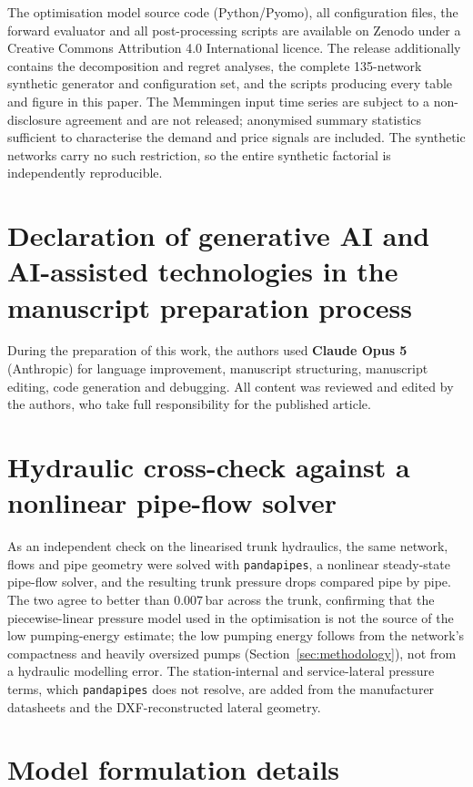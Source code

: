 \documentclass[a4paper,fleqn]{cas-sc}
\begin{document}
The optimisation model source code (Python/Pyomo), all configuration files, the forward
evaluator and all post-processing scripts are available on Zenodo
\citep{ruess_2026_calion} under a Creative Commons Attribution 4.0 International licence.
The release additionally contains the decomposition and regret
analyses, the complete 135-network synthetic generator and configuration set, and the
scripts producing every table and figure in this paper. The Memmingen input time series
are subject to a non-disclosure agreement and are not released; anonymised summary
statistics sufficient to characterise the demand and price signals are included. The
synthetic networks carry no such restriction, so the entire synthetic factorial is
independently reproducible.

\section*{Declaration of generative AI and AI-assisted technologies in the manuscript
preparation process}

During the preparation of this work, the authors used \textbf{Claude Opus 5} (Anthropic)
for language improvement, manuscript structuring, manuscript editing, code generation and debugging. All content was reviewed and edited by the authors, who take full responsibility for the published article.

\appendix

\section{Hydraulic cross-check against a nonlinear pipe-flow solver}\label{app:pandapipes}
As an independent check on the linearised trunk hydraulics, the same network, flows and pipe
geometry were solved with \texttt{pandapipes}, a nonlinear steady-state pipe-flow solver, and
the resulting trunk pressure drops compared pipe by pipe. The two agree to better than
$0.007$\,bar across the trunk, confirming that the piecewise-linear pressure model used in the
optimisation is not the source of the low pumping-energy estimate; the low pumping energy
follows from the network's compactness and heavily oversized pumps (Section~\ref{sec:methodology}),
not from a hydraulic modelling error. The station-internal and service-lateral pressure terms,
which \texttt{pandapipes} does not resolve, are added from the manufacturer datasheets and the
DXF-reconstructed lateral geometry.

\section{Model formulation details}
\label{app:model_details}
\end{document}
